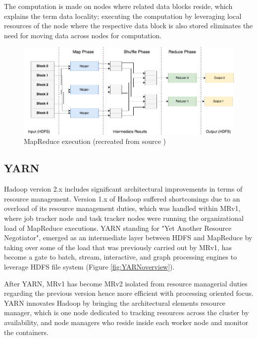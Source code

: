 \documentclass[review]{elsarticle}
\begin{document}
	The computation is made on nodes where related data blocks reside, which explains the term data locality; executing the computation by leveraging local resources of the node where the respective data block is also stored eliminates the need for moving data across nodes for computation.
	
	\begin{figure}[h!]
		\caption{MapReduce execution (recreated from source \cite{schatzle_giant_nodate})}
		\label{fig:MapReduce}
		\includegraphics[width=\textwidth]{MapReduce}
		\centering
	\end{figure}
	
	\subsection{YARN}\label{YARN}
	Hadoop version 2.x includes significant architectural improvements in terms of resource management. Version 1.x of Hadoop suffered shortcomings due to an overload of its resource management duties, which was handled within MRv1, where job tracker node and task tracker nodes were running the organizational load of MapReduce executions. YARN standing for "Yet Another Resource Negotiator", emerged as an intermediate layer between HDFS and MapReduce by taking over some of the load that was previously carried out by MRv1, has become a gate to batch, stream, interactive, and graph processing engines to leverage HDFS file system (Figure \ref{fig:YARNoverview}). 
	
	After YARN, MRv1 has become MRv2 isolated from resource managerial duties regarding the previous version hence more efficient with processing oriented focus. YARN innovates Hadoop by bringing the architectural elements resource manager, which is one node dedicated to tracking resources across the cluster by availability, and node managers who reside inside each worker node and monitor the containers.
	
\end{document}
